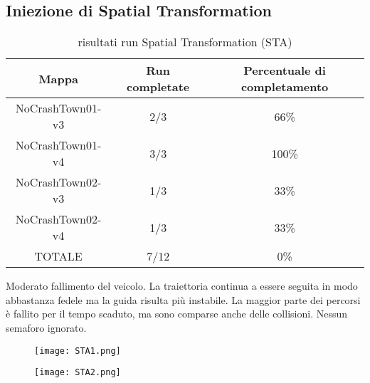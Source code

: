\subsection{Iniezione di Spatial Transformation}
\begin{table}[h!]
    \begin{tabular}{|c|c|c|}
        \hline
        Mappa                   & Run completate & Percentuale di completamento\\
        \hline
        NoCrashTown01-v3        & 2/3            & 66\% \\
        NoCrashTown01-v4        & 3/3            & 100\% \\
        NoCrashTown02-v3        & 1/3            & 33\% \\
        NoCrashTown02-v4        & 1/3            & 33\%  \\
        TOTALE                  & 7/12           & 0\% \\
        \hline
    \end{tabular}
    \caption{risultati run Spatial Transformation (STA)}
    \label{tab:sta}
\end{table}
Moderato fallimento del veicolo. La traiettoria continua a essere seguita in modo abbastanza fedele ma la guida risulta più instabile.
La maggior parte dei percorsi è fallito per il tempo scaduto, ma sono comparse anche delle collisioni. Nessun semaforo ignorato.
\begin{figure}[h]
    \centering
    \parbox{6cm}{
    \texttt{[image: STA1.png]}
    \label{fig:sta1}}
    \qquad
    \begin{minipage}{6cm}
    \texttt{[image: STA2.png]}
    \label{fig:sta2}
    \end{minipage}
    \label{fig:starun}
    \end{figure}

